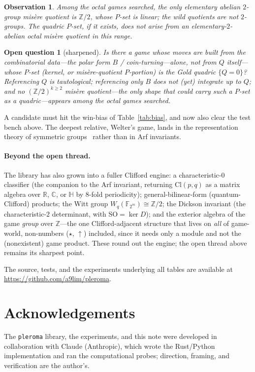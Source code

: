 \documentclass[11pt]{article}
\newtheorem{observation}{Observation}
\newtheorem*{question}{Open question}
\theoremstyle{definition}
\newcommand{\F}{\mathbb{F}}
\newcommand{\Cl}{\mathrm{Cl}}
\begin{document}
\begin{observation}
Among the octal games searched, the only elementary abelian $2$-group misère
quotient is $\mathbb{Z}/2$, whose $P$-set is linear; the wild quotients are not
$2$-groups. The quadric $P$-set, if it exists, does not arise from an
elementary-$2$-abelian octal misère quotient in this range.
\end{observation}

\begin{question}[sharpened]
Is there a game whose moves are built from the combinatorial data---the polar
form $B$ / coin-turning---\emph{alone, not from $Q$ itself}---whose $P$-set
(kernel, or misère-quotient $P$-portion) is the Gold quadric $\{Q=0\}$?
Referencing $Q$ is tautological; referencing only $B$ does not (yet) integrate up
to $Q$; and no $(\mathbb{Z}/2)^{k\ge2}$ misère quotient---the only shape that
could carry such a $P$-set as a quadric---appears among the octal games searched.
\end{question}

A candidate must hit the win-bias of Table~\ref{tab:bias}, and now also clear the
test bench above. The deepest relative, Welter's game, lands in the
representation theory of symmetric groups~\cite{Irie18} rather than in Arf
invariants.

\paragraph{Beyond the open thread.}
The library has also grown into a fuller Clifford engine: a characteristic-$0$
classifier (the companion to the Arf invariant, returning $\Cl(p,q)$ as a matrix
algebra over $\mathbb{R}$, $\mathbb{C}$, or $\mathbb{H}$ by $8$-fold periodicity);
general-bilinear-form (quantum-Clifford) products; the Witt group
$W_q(\F_{2^m})\cong\mathbb{Z}/2$; the Dickson invariant (the characteristic-$2$
determinant, with $\mathrm{SO}=\ker D$); and the exterior algebra of the game
\emph{group} over $\mathbb{Z}$---the one Clifford-adjacent structure that lives on
\emph{all} of game-world, non-numbers ($\star$, $\uparrow$) included, since it
needs only a module and not the (nonexistent) game product. These round out the
engine; the open thread above remains its sharpest point.

The source, tests, and the experiments underlying all tables are available at
\url{https://github.com/a9lim/pleroma}.

\section*{Acknowledgements}
The \texttt{pleroma} library, the experiments, and this note were developed in
collaboration with Claude (Anthropic), which wrote the Rust/Python
implementation and ran the computational probes; direction, framing, and
verification are the author's.
\end{document}
